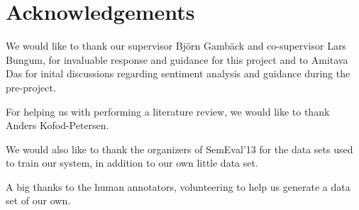 \section*{Acknowledgements}

We would like to thank our supervisor Bj\"{o}rn Gamb\"{a}ck and co-supervisor Lars Bungum, for invaluable response and guidance for this project and to Amitava Das for inital discussions regarding sentiment analysis and guidance during the pre-project. 

For helping us with performing a literature review, we would like to thank Anders Kofod-Petersen.

We would also like to thank the organizers of SemEval'13 for the data sets used to train our system, in addition to our own little data set. 

A big thanks to the human annotators, volunteering to help us generate a data set of our own.  

\cleardoublepage